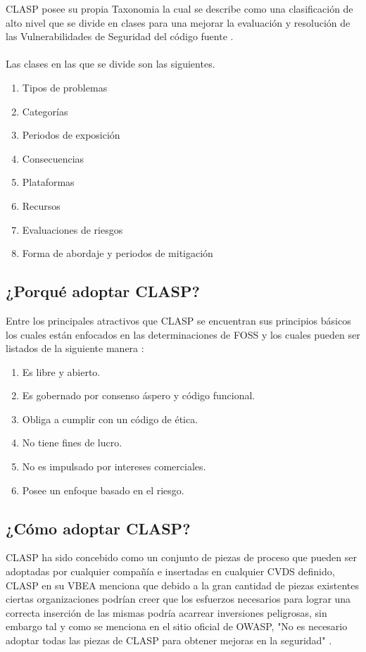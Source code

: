 \documentclass[runningheads,a4paper]{llncs}
\begin{document}
 \gls{CLASP} posee su propia \gls{Taxonomia} la cual se describe como una clasificación de alto nivel que se divide en clases para una mejorar la evaluación y resolución de las Vulnerabilidades de Seguridad del código fuente \cite{CLASPConcepts}.
\\\\
Las clases en las que se divide son las siguientes.
\\
\begin{enumerate}
	\item Tipos de problemas
	\item Categorías
	\item Periodos de exposición
	\item Consecuencias
	\item Plataformas
	\item Recursos
	\item Evaluaciones de riesgos
	\item Forma de abordaje y periodos de mitigación
\end{enumerate}

\subsection{¿Porqué adoptar \gls{CLASP}?}
Entre los principales atractivos que \gls{CLASP} se encuentran sus principios básicos los cuales están enfocados en las determinaciones de \gls{FOSS} y los cuales pueden ser listados de la siguiente manera \cite{CLASPConcepts}:

\begin{enumerate}
	\item Es libre y abierto. 
	\item Es gobernado por consenso áspero y código funcional.
	\item Obliga a cumplir con un código de ética.
	\item No tiene fines de lucro.
	\item No es impulsado por intereses comerciales.
	\item Posee un enfoque basado en el riesgo.
\end{enumerate}

\subsection{¿Cómo adoptar \gls{CLASP}?}
\gls{CLASP} ha sido concebido como un conjunto de piezas de proceso que pueden ser adoptadas por cualquier compañía e insertadas en cualquier \gls{CVDS} definido, \gls{CLASP} en su \gls{VBEA} menciona que debido a la gran cantidad de piezas existentes ciertas organizaciones podrían creer que los esfuerzos necesarios para lograr una correcta inserción de las mismas podría acarrear inversiones peligrosas, sin embargo tal y como se menciona en el sitio oficial de \gls{OWASP}, "No es necesario adoptar todas las piezas de \gls{CLASP} para obtener mejoras en la seguridad" \cite{AAViewCLAPS}.\\
\end{document}
